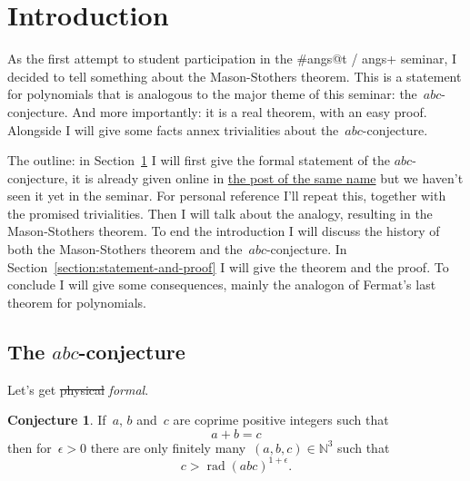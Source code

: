\documentclass[11pt, a4paper, openany, oneside, article]{memoir}
\theoremstyle{definition}
\newtheorem{conjecture}[theorem]{Conjecture}
\DeclareMathOperator\rad{rad}
\begin{document}
\title{}
\author{Pieter Belmans}
\maketitle

\section{Introduction}
\label{section:introduction}

As the first attempt to student participation in the \#angs@t / angs+ seminar, I decided to tell something about the Mason-Stothers theorem. This is a statement for polynomials that is analogous to the major theme of this seminar: the~$abc$\nobreakdash-conjecture. And more importantly: it is a real theorem, with an easy proof. Alongside I will give some facts annex trivialities about the~$abc$\nobreakdash-conjecture.

The outline: in Section~\ref{section:introduction} I will first give the formal statement of the $abc$-conjecture, it is already given online in \href{http://www.noncommutative.org/index.php/the-abc-conjecture.html}{the post of the same name} but we haven't seen it yet in the seminar. For personal reference I'll repeat this, together with the promised trivialities. Then I will talk about the analogy, resulting in the Mason-Stothers theorem. To end the introduction I will discuss the history of both the Mason-Stothers theorem and the~$abc$\nobreakdash-conjecture. In Section~\ref{section:statement-and-proof} I will give the theorem and the proof. To conclude I will give some consequences, mainly the analogon of Fermat's last theorem for polynomials.

\subsection{The $abc$-conjecture}

Let's get \sout{physical} \emph{formal}.

\begin{conjecture}
  \label{conjecture:abc}
  If~$a$, $b$ and~$c$ are coprime positive integers such that
  \begin{equation}
    \label{equation:abc-equality}
    a+b=c
  \end{equation}
  then for~$\epsilon>0$ there are only finitely many~$(a,b,c)\in\mathbb{N}^3$ such that
  \begin{equation}
    \label{equation:abc-inequality}
    c>\rad(abc)^{1+\epsilon}.
  \end{equation}
\end{conjecture}
\end{document}
